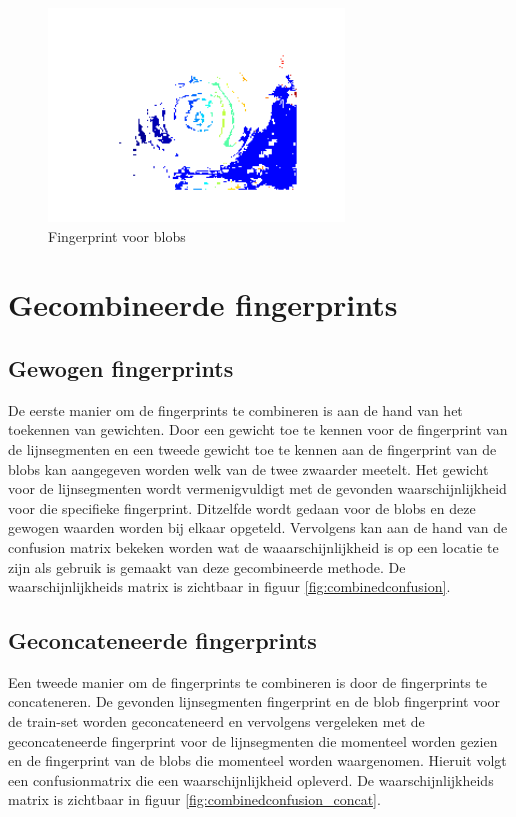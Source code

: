 \documentclass[a4paper]{article}
\begin{document}
\begin{figure}[h]
	\centering
	\includegraphics[width=0.7\textwidth]{fingerprintblob.png}
	\caption{Fingerprint voor blobs}
	\label{fig:blobfinger}
\end{figure}


\section{Gecombineerde fingerprints}
\subsection{Gewogen fingerprints}
De eerste manier om de fingerprints te combineren is aan de hand van het toekennen van gewichten. Door een gewicht toe te kennen voor de fingerprint van de lijnsegmenten en een tweede gewicht toe te kennen aan de fingerprint van de blobs kan aangegeven worden welk van de twee zwaarder meetelt. Het gewicht voor de lijnsegmenten wordt vermenigvuldigt met de gevonden waarschijnlijkheid voor die specifieke fingerprint. Ditzelfde wordt gedaan voor de blobs en deze gewogen waarden worden bij elkaar opgeteld. Vervolgens kan aan de hand van de confusion matrix bekeken worden wat de waaarschijnlijkheid is op een locatie te zijn als gebruik is gemaakt van deze gecombineerde methode. De waarschijnlijkheids matrix is zichtbaar in figuur \ref{fig:combinedconfusion}.

\subsection{Geconcateneerde fingerprints}
Een tweede manier om de fingerprints te combineren is door de fingerprints te concateneren. De gevonden lijnsegmenten fingerprint en de blob fingerprint voor de train-set worden geconcateneerd en vervolgens vergeleken met de geconcateneerde fingerprint voor de lijnsegmenten die momenteel worden gezien en de fingerprint van de blobs die momenteel worden waargenomen. Hieruit volgt een confusionmatrix die een waarschijnlijkheid opleverd. De waarschijnlijkheids matrix is zichtbaar in figuur \ref{fig:combinedconfusion_concat}.
\end{document}
